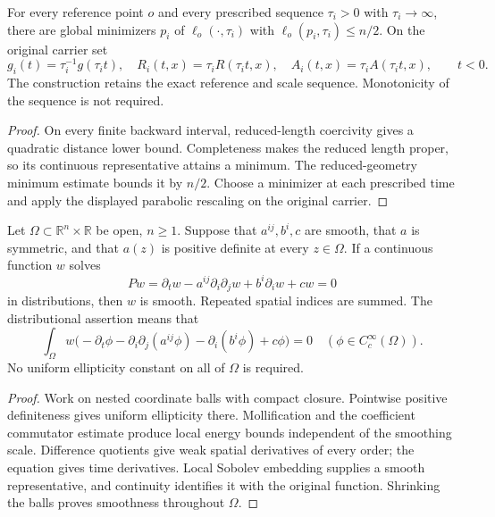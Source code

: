 \begin{proposition}
\label{prop:ancient-sequence}
For every reference point $o$ and every prescribed sequence $\tau_i>0$
with $\tau_i\to\infty$, there are global minimizers $p_i$ of
$\ell_o(\cdot,\tau_i)$ with $\ell_o(p_i,\tau_i)\leq n/2$.
On the original carrier set
\[
 g_i(t)=\tau_i^{-1}g(\tau_i t),\quad
 R_i(t,x)=\tau_i R(\tau_i t,x),\quad
 A_i(t,x)=\tau_i A(\tau_i t,x),\qquad t<0.
\]
The construction retains the exact reference and scale sequence.
Monotonicity of the sequence is not required.
\end{proposition}
\begin{proof}
On every finite backward interval, reduced-length coercivity gives a quadratic
distance lower bound. Completeness makes the reduced length proper, so its
continuous representative attains a minimum. The reduced-geometry minimum
estimate bounds it by $n/2$. Choose a minimizer at each prescribed time and
apply the displayed parabolic rescaling on the original carrier.
\end{proof}

\begin{lemma}
\label{lem:ancient-weak-regularity}
Let $\Omega\subset\mathbb R^n\times\mathbb R$ be open, $n\geq1$.
Suppose that $a^{ij},b^i,c$ are smooth, that $a$ is symmetric,
and that $a(z)$ is positive definite at every $z\in\Omega$.
If a continuous function $w$ solves
\[
 Pw=\partial_t w-a^{ij}\partial_i\partial_jw
                  +b^i\partial_iw+cw=0
\]
in distributions, then $w$ is smooth.  Repeated spatial indices
are summed.  The distributional assertion means that
\[
 \int_\Omega w\bigl(-\partial_t\phi
       -\partial_i\partial_j(a^{ij}\phi)
       -\partial_i(b^i\phi)+c\phi\bigr)=0
 \quad(\phi\in C_c^\infty(\Omega)).
\]
No uniform ellipticity constant on all of $\Omega$ is required.
\end{lemma}
\begin{proof}
Work on nested coordinate balls with compact closure. Pointwise positive
definiteness gives uniform ellipticity there. Mollification and the
coefficient commutator estimate produce local energy bounds independent of the
smoothing scale. Difference quotients give weak spatial derivatives of every
order; the equation gives time derivatives. Local Sobolev embedding supplies a
smooth representative, and continuity identifies it with the original
function. Shrinking the balls proves smoothness throughout $\Omega$.
\end{proof}

